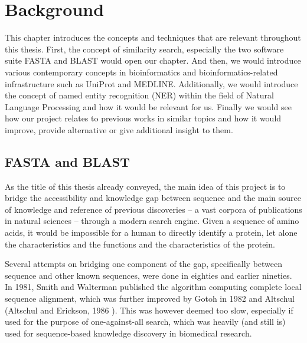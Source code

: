 
\chapter{Background} %

\label{Chapter2} %


This chapter introduces the concepts and techniques that are relevant throughout this thesis. First, the concept of similarity search, especially the two software suite FASTA and BLAST would open our chapter. And then, we would introduce various contemporary concepts in bioinformatics and bioinformatics-related infrastructure such as UniProt and MEDLINE. Additionally, we would introduce the concept of named entity recognition (NER) within the field of Natural Language Processing and how it would be relevant for us. Finally we would see how our project relates to previous works in similar topics and how it would improve, provide alternative or give additional insight to them.


\section{FASTA and BLAST}

As the title of this thesis already conveyed, the main idea of this project is to bridge the accessibility and knowledge gap between sequence and the main source of knowledge and reference of previous discoveries -- a vast corpora of publications in natural sciences -- through a modern search engine. Given a sequence of amino acids, it would be impossible for a human to directly identify a protein, let alone the characteristics and the functions and the characteristics of the protein.

Several attempts on bridging one component of the gap, specifically between sequence and other known sequences, were done in eighties and earlier nineties. In 1981, Smith and Walterman published the algorithm computing complete local sequence alignment, which was further improved by Gotoh in 1982 \citep{gotoh1982improved} and Altschul (Altschul and Erickson, 1986 \citep{altschul1986optimal}). This was however deemed too slow, especially if used for the purpose of one-against-all search, which was heavily (and still is) used for sequence-based knowledge discovery in biomedical research.

